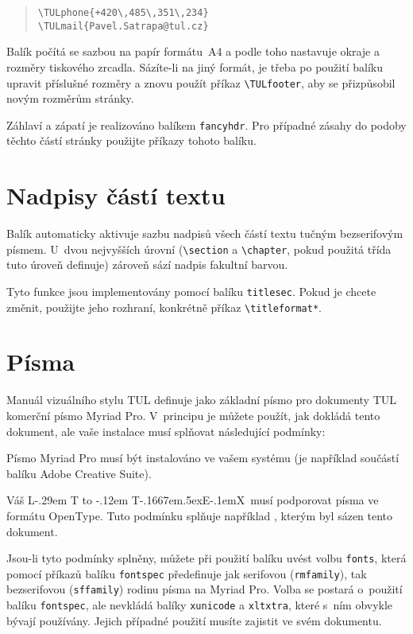 \documentclass[a4paper,12pt,twoside]{article}
\makeatletter
\newcommand{\cmdfont}[1]{\texttt{\color{\tulcolor}#1}}
\newcommand{\cmd}[1]{\cmdfont{\textbackslash #1}}
\newenvironment{itemize*}%
  {\begin{itemize}%
    \setlength{\parskip}{0.25\baselineskip}%
    \setlength{\itemsep}{0pt}%
    \setlength{\partopsep}{0pt}%
    \setlength{\topsep}{0pt}}%
  {\end{itemize}}
\def\TeX{T\kern-.1667em\lower.5ex\hbox{E}\kern-.1emX\@}
\DeclareRobustCommand{\LaTeX}{L\kern-.29em%
        {\sbox\z@ T%
         \vbox to\ht\z@{\hbox{\check@mathfonts
                              \fontsize\sf@size\z@
                              \math@fontsfalse\selectfont
                              A}%
                        \vss}%
        }%
        \kern-.12em%
        \TeX}
\DeclareRobustCommand\XeLaTeX{%
  \leavevmode
  \smash{%
    X\lower.5ex
    \hbox{\kern-.1em
      \setbox0=\hbox{E}\dimen0=\ht0\advance\dimen0by\dp0\relax
      \reflectbox{E}%
    }\kern-0.075em\LaTeX}}
\makeatother
\begin{document}
\begin{quote}
\cmd{TULphone\{+420\textbackslash ,485\textbackslash ,351\textbackslash ,234\}}\\
\cmd{TULmail\{Pavel.Satrapa@tul.cz\}}
\end{quote}

Balík počítá se sazbou na papír formátu~A4 a podle toho nastavuje okraje a
rozměry tiskového zrcadla. Sázíte-li na jiný formát, je třeba po použití balíku
upravit příslušné rozměry a znovu použít příkaz \cmd{TULfooter}, aby se
přizpůsobil novým rozměrům stránky.

Záhlaví a zápatí je realizováno balíkem \cmdfont{fancyhdr}. Pro případné zásahy
do podoby těchto částí stránky použijte příkazy tohoto balíku.


\section{Nadpisy částí textu}

Balík automaticky aktivuje sazbu nadpisů všech částí textu tučným bezserifovým
písmem. U~dvou nejvyšších úrovní (\cmd{section} a \cmd{chapter}, pokud použitá
třída tuto úroveň definuje) zároveň sází nadpis fakultní barvou.

Tyto funkce jsou implementovány pomocí balíku \cmdfont{titlesec}. Pokud je
chcete změnit, použijte jeho rozhraní, konkrétně příkaz \cmd{titleformat*}.


\section{Písma}\label{pisma}

Manuál vizuálního stylu TUL definuje jako základní písmo pro dokumenty TUL
komerční písmo Myriad Pro. V~principu je můžete použít, jak dokládá tento
dokument, ale vaše instalace musí splňovat následující podmínky:

\begin{itemize*}
\item Písmo Myriad Pro musí být instalováno ve vašem systému (je například
součástí balíku Adobe Creative Suite).

\item Váš \LaTeX\ musí podporovat písma ve formátu OpenType. Tuto podmínku
splňuje například \XeLaTeX, kterým byl sázen tento dokument.
\end{itemize*}

Jsou-li tyto podmínky splněny, můžete při použití balíku uvést volbu
\cmdfont{fonts}, která pomocí příkazů balíku \cmdfont{fontspec} předefinuje jak
serifovou (\cmdfont{rmfamily}), tak bezserifovou (\cmdfont{sffamily}) rodinu
písma na Myriad Pro. Volba se postará o~použití balíku \cmdfont{fontspec}, ale
nevkládá balíky \cmdfont{xunicode} a \cmdfont{xltxtra}, které s~ním obvykle
bývají používány. Jejich případné použití musíte zajistit ve svém dokumentu.
\end{document}
